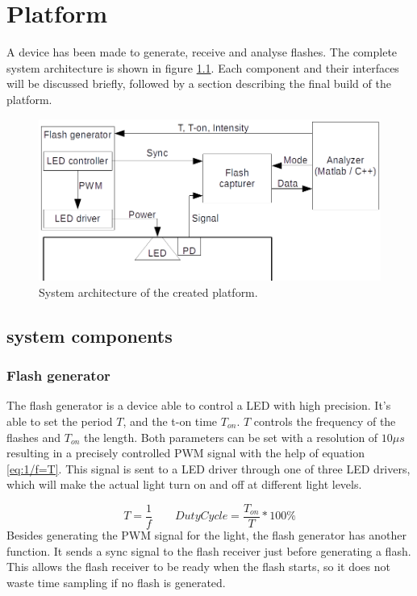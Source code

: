 \chapter{Platform}
\label{chp:Platform}
A device has been made to generate, receive and analyse flashes. The complete system architecture is shown in figure \ref{fig:systemOveriew}. Each component and their interfaces will be discussed briefly, followed by a section describing the final build of the platform.

\begin{figure}[h]
	\includegraphics[width=\textwidth]{pics/systemOverview.png}
	\caption{System architecture of the created platform.\label{fig:systemOveriew}}
	
\end{figure}

\section{system components}

\subsection{Flash generator}
The flash generator is a device able to control a LED with high precision. It's able to set the period $T$, and the t-on time $T_{on}$. $T$ controls the frequency of the flashes and $T_{on}$ the length. Both parameters can be set with a resolution of $10\mu s$ resulting in a precisely controlled PWM signal with the help of equation \ref{eq:1/f=T}. This signal is sent to a LED driver through one of three LED drivers, which will make the actual light turn on and off at different light levels.

\begin{equation}
\label{eq:1/f=T}
T=\frac{1}{f}
\qquad
DutyCycle=\frac{T_{on}}{T} * 100\%
\end{equation}
Besides generating the PWM signal for the light, the flash generator has another function. It sends a sync signal to the flash receiver just before generating a flash. This allows the flash receiver to be ready when the flash starts, so it does not waste time sampling if no flash is generated.

